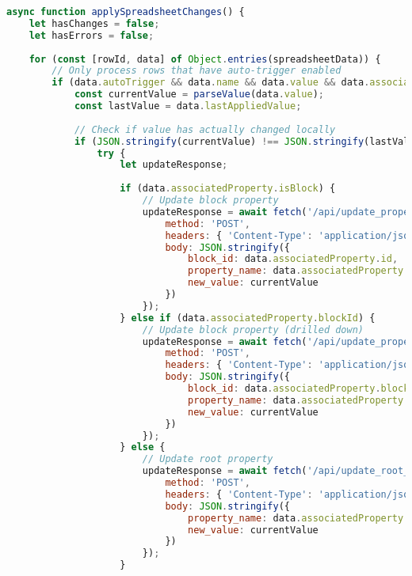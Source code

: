 \documentclass[12pt,a4paper]{article}
\begin{document}
\begin{lstlisting}[language=JavaScript, caption=Auto-Trigger Implementation]
async function applySpreadsheetChanges() {
    let hasChanges = false;
    let hasErrors = false;
    
    for (const [rowId, data] of Object.entries(spreadsheetData)) {
        // Only process rows that have auto-trigger enabled
        if (data.autoTrigger && data.name && data.value && data.associatedProperty) {
            const currentValue = parseValue(data.value);
            const lastValue = data.lastAppliedValue;
            
            // Check if value has actually changed locally
            if (JSON.stringify(currentValue) !== JSON.stringify(lastValue)) {
                try {
                    let updateResponse;
                    
                    if (data.associatedProperty.isBlock) {
                        // Update block property
                        updateResponse = await fetch('/api/update_property', {
                            method: 'POST',
                            headers: { 'Content-Type': 'application/json' },
                            body: JSON.stringify({
                                block_id: data.associatedProperty.id,
                                property_name: data.associatedProperty.name,
                                new_value: currentValue
                            })
                        });
                    } else if (data.associatedProperty.blockId) {
                        // Update block property (drilled down)
                        updateResponse = await fetch('/api/update_property', {
                            method: 'POST',
                            headers: { 'Content-Type': 'application/json' },
                            body: JSON.stringify({
                                block_id: data.associatedProperty.blockId,
                                property_name: data.associatedProperty.name,
                                new_value: currentValue
                            })
                        });
                    } else {
                        // Update root property
                        updateResponse = await fetch('/api/update_root_property', {
                            method: 'POST',
                            headers: { 'Content-Type': 'application/json' },
                            body: JSON.stringify({
                                property_name: data.associatedProperty.name,
                                new_value: currentValue
                            })
                        });
                    }
                    

\end{lstlisting}
\end{document}
